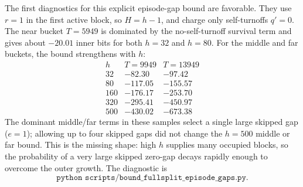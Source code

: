 The first diagnostics for this explicit episode-gap bound are favorable.  They use \(r=1\) in the first active block,
so \(H=h-1\), and charge only self-turnoffs \(q'=0\).  The near bucket \(T=5949\) is dominated by the no-self-turnoff
survival term and gives about \(-20.01\) inner bits for both \(h=32\) and \(h=80\).  For the middle and far buckets,
the bound strengthens with \(h\):
\[
\begin{array}{c|c|c}
h & T=9949 & T=13949\\
\hline
32 & -82.30 & -97.42\\
80 & -117.05 & -155.57\\
160 & -176.17 & -253.70\\
320 & -295.41 & -450.97\\
500 & -430.02 & -673.38
\end{array}
\]
The dominant middle/far terms in these samples select a single large skipped gap (\(e=1\)); allowing up to four skipped
gaps did not change the \(h=500\) middle or far bound.  This is the missing shape: high \(h\) supplies many occupied
blocks, so the probability of a very large skipped zero-gap decays rapidly enough to overcome the outer growth.
The diagnostic is
\[
\texttt{python scripts/bound\_fullsplit\_episode\_gaps.py}.
\]

